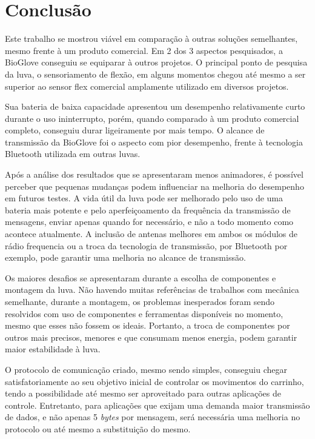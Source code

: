 \documentclass[
	12pt,				%
	openright,			%
	oneside,			%
	a4paper,			%
	english,			%
	brazil				%
	]{abntex2}
\begin{document}



		\chapter{Conclusão}

		Este trabalho se mostrou viável em comparação à outras soluções semelhantes, mesmo frente à um produto comercial. Em 2 dos 3 aspectos pesquisados, a BioGlove conseguiu se equiparar à outros projetos. O principal ponto de pesquisa da luva, o sensoriamento de flexão, em alguns momentos chegou até mesmo a ser superior ao sensor flex comercial amplamente utilizado em diversos projetos.

		Sua bateria de baixa capacidade apresentou um desempenho relativamente curto durante o uso ininterrupto, porém, quando comparado à um produto comercial completo, conseguiu durar ligeiramente por mais tempo. O alcance de transmissão da BioGlove foi o aspecto com pior desempenho, frente à tecnologia Bluetooth utilizada em outras luvas. 

		Após a análise dos resultados que se apresentaram menos animadores, é possível perceber que pequenas mudanças podem influenciar na melhoria do desempenho em futuros testes. A vida útil da luva pode ser melhorado pelo uso de uma bateria mais potente e pelo aperfeiçoamento da frequência da transmissão de mensagens, enviar apenas quando for necessário, e não a todo momento como acontece atualmente. A inclusão de antenas melhores em ambos os módulos de rádio frequencia ou a troca da tecnologia de transmissão, por Bluetooth por exemplo, pode garantir uma melhoria no alcance de transmissão.

		Os maiores desafios se apresentaram durante a escolha de componentes e montagem da luva. Não havendo muitas referências de trabalhos com mecânica semelhante, durante a montagem, os problemas inesperados foram sendo resolvidos com uso de componentes e ferramentas disponíveis no momento, mesmo que esses não fossem os ideais. Portanto, a troca de componentes por outros mais precisos, menores e que consumam menos energia, podem garantir maior estabilidade à luva.

		O protocolo de comunicação criado, mesmo sendo simples, conseguiu chegar satisfatoriamente ao seu objetivo inicial de controlar os movimentos do carrinho, tendo a possibilidade até mesmo ser aproveitado para outras aplicações de controle. Entretanto, para aplicações que exijam uma demanda maior transmissão de dados, e não apenas 5 \textit{bytes} por mensagem, será necessária uma melhoria no protocolo ou até mesmo a substituição do mesmo.
\end{document}

